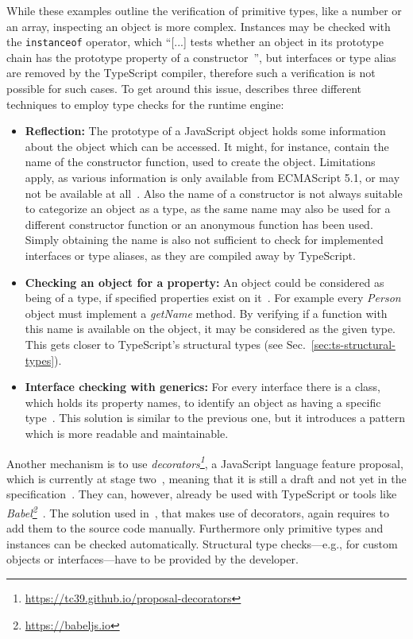 While these examples outline the verification of primitive types, like a number or an array, inspecting an object is more complex. Instances may be checked with the \texttt{instanceof} operator, which ``[...] tests whether an object in its prototype chain has the prototype property of a constructor~\cite{instanceof:MDN:2017}'', but interfaces or type alias are removed by the TypeScript compiler, therefore such a verification is not possible for such cases. To get around this issue, \citeauthor{MasteringTypeScript:Rozentals:2015} describes three different techniques to employ type checks for the runtime engine:
\begin{itemize}
  \item \textbf{Reflection:} The prototype of a JavaScript object holds 
some information about the object which can be accessed. It might, for instance, contain the name of the constructor function, used to create the object. Limitations apply, as various
information is only available from ECMAScript 5.1, or may not be available at all~\cite[pp.~98--100]{MasteringTypeScript:Rozentals:2015}. Also the name of a constructor is not always suitable to categorize an object as a type, as the same name may also be used for a different constructor function or an anonymous function has been used. Simply obtaining the name is also not sufficient to check for implemented interfaces or type aliases, as they are compiled away by TypeScript.
  \item \textbf{Checking an object for a property:} An object could be considered 
as being of a type, if specified properties exist on it~\cites[pp.~101--102]{MasteringTypeScript:Rozentals:2015}[pp.~18--20]{ProJavaScriptDesignPatterns:HarmesDiaz:2008}. For example every \textit{Person} object must implement a \textit{getName} method. By verifying if a function with this name is available on the object, it may be considered as the given type. This gets closer to TypeScript's structural types (see Sec.~\ref{sec:ts-structural-types}).
  \item \textbf{Interface checking with generics:} For every interface there is a 
class, which holds its property names, to identify an object as 
having a specific type~\cites[pp.~102--105]{MasteringTypeScript:Rozentals:2015}[pp.~17--19]{ProJavaScriptDesignPatterns:HarmesDiaz:2008}. This solution is similar to the previous one, but it introduces a pattern which is more readable and maintainable.
\end{itemize}
Another mechanism is to use \textit{decorators\footnote{\url{https://tc39.github.io/proposal-decorators}}},
a JavaScript language feature proposal, which is currently at stage two~\cite{DecoratorsProposalRepo}, meaning that it is still a draft and not yet in the specification~\cite{EcmaScriptProposalProcess}. They can, however, already be used with TypeScript or tools like \emph{Babel\footnote{\url{https://babeljs.io}}}~\cite{TypeScriptHandbook:Decorators, Babel:Plugins:Decorators}.
The solution used in~\cite{DecoratorTypeChecks}, that makes use of decorators, again requires
to add them to the source code manually. Furthermore only primitive types and instances can be checked automatically. Structural type checks---e.g., for custom objects or interfaces---have
to be provided by the developer.

